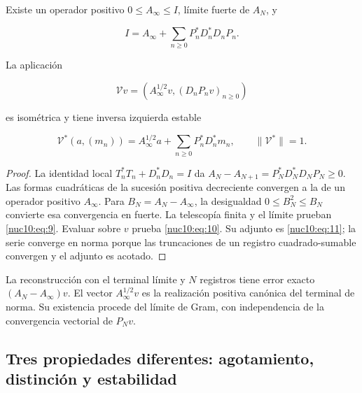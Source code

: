 \begin{theorem}
\label{nuclear:terminal-no-estacionario}
Existe un operador positivo \(0\leq A_\infty\leq I\), límite fuerte de \(A_N\), y



\begin{equation}
\boxed{I=A_\infty+\sum_{n\ge0}P_n^*D_n^*D_nP_n.}
\label{nuc10:eq:9}
\end{equation}



La aplicación



\begin{equation}
\boxed{\mathcal Vv=(A_\infty^{1/2}v,(D_nP_nv)_{n\ge0})}
\label{nuc10:eq:10}
\end{equation}



es isométrica y tiene inversa izquierda estable



\begin{equation}
\mathcal V^*(a,(m_n))=A_\infty^{1/2}a+
\sum_{n\ge0}P_n^*D_n^*m_n,\qquad\|\mathcal V^*\|=1.
\label{nuc10:eq:11}
\end{equation}



\end{theorem}
\begin{proof}
La identidad local \(T_n^*T_n+D_n^*D_n=I\) da
\(A_N-A_{N+1}=P_N^*D_N^*D_NP_N\geq0\). Las formas cuadráticas de
la sucesión positiva decreciente convergen a la de un operador positivo
\(A_\infty\). Para \(B_N=A_N-A_\infty\), la desigualdad
\(0\leq B_N^2\leq B_N\) convierte esa convergencia en fuerte.
La telescopía finita y el límite prueban \eqref{nuc10:eq:9}. Evaluar sobre \(v\)
prueba \eqref{nuc10:eq:10}. Su adjunto es \eqref{nuc10:eq:11}; la serie converge en norma porque
las truncaciones de un registro cuadrado-sumable convergen y el adjunto es acotado.
\end{proof}

La reconstrucción con el terminal límite y \(N\) registros tiene error
exacto \((A_N-A_\infty)v\). El vector \(A_\infty^{1/2}v\) es la
realización positiva canónica del terminal de norma. Su existencia procede
del límite de Gram, con independencia de la convergencia vectorial de \(P_Nv\).

\subsection{Tres propiedades diferentes: agotamiento, distinción y estabilidad}

